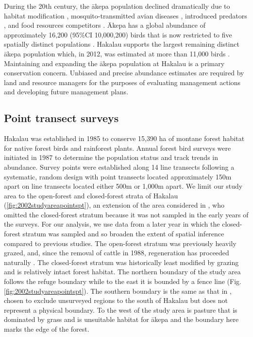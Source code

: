\documentclass{statsoc}
\newcommand{\akepa}{\textquotesingle\={a}kepa}  %
\newcommand{\Akepa}{\textquotesingle\={A}kepa}  %
\begin{document}
During the 20th century, the \akepa{} population declined dramatically due to habitat modification \citep{scott_HFBS_1986, pratt_avifaunal_1994},  mosquito-transmitted avian diseases \citep{pratt_avifaunal_1994, atkinson_wildlife_1995}, introduced predators \citep{lepson_akepa_1997}, and food resources competitors \citep{lepson_akepa_1997}. \Akepa{} has a global abundance of approximately 16,200 (95\%CI 10,000,200) birds that is now restricted to five spatially distinct populations \citep{judge_akepa_2018}. Hakalau supports the largest remaining distinct \akepa{} population which, in 2012, was estimated at more than 11,000 birds \citep{camp_statespace_2016}. Maintaining and expanding the \akepa{} population at Hakalau is a primary conservation concern. Unbiased and precise abundance estimates are required by land and resource managers for the purposes of evaluating management actions and developing future management plans.

\subsection{Point transect surveys}

Hakalau was established in 1985 to conserve 15,390 ha of montane forest habitat for native forest birds and rainforest plants. Annual forest bird surveys were initiated in 1987 to determine the population status and track trends in abundance. Survey points were established along 14 line transects following a systematic, random design with point transects located approximately 150m apart on line transects located either 500m or 1,000m apart. We limit our study area to the open-forest and closed-forest strata of Hakalau (\autoref{fig:2002studyareapointspt}), an extension of the area considered in \cite{camp_population_2010, camp_statespace_2016}, who omitted the closed-forest stratum because it was not sampled in the early years of the surveys.  For our analysis, we use data from a later year in which the closed-forest stratum was sampled and so broaden the extent of spatial inference compared to previous studies.  The open-forest stratum was previously heavily grazed, and, since the removal of cattle in 1988, regeneration has proceeded naturally \citep{maxfield_hakalau_1998}. The closed-forest stratum was historically least modified by grazing and is relatively intact forest habitat.  The northern boundary of the study area follows the refuge boundary while to the east it is bounded by a fence line (Fig. \ref{fig:2002studyareapointspt}). The southern boundary is the same as that in \cite{camp_population_2010}, chosen to exclude unsurveyed regions to the south of Hakalau but does not represent a physical boundary. To the west of the study area is pasture that is dominated by grass and is unsuitable habitat for \akepa{} and the boundary here marks the edge of the forest.
\end{document}
